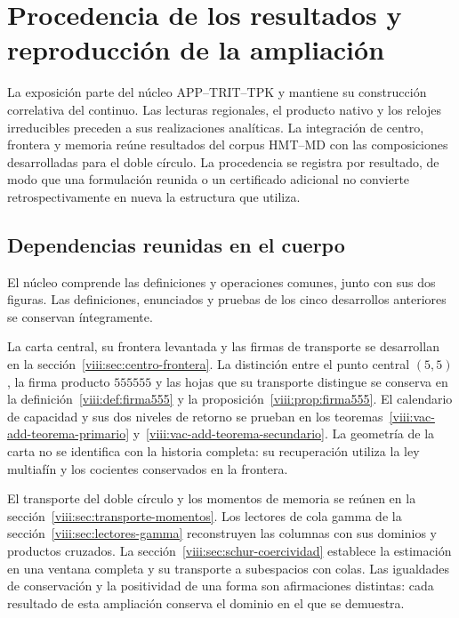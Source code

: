 \section{Procedencia de los resultados y reproducción de la ampliación}
\label{viii:ap:procedencia-reproduccion}
\begingroup
\setlength{\parskip}{1pt}

La exposición parte del núcleo APP--TRIT--TPK y mantiene su construcción
correlativa del continuo. Las lecturas regionales, el producto nativo y los
relojes irreducibles preceden a sus realizaciones analíticas. La integración
de centro, frontera y memoria reúne resultados del corpus HMT--MD con
las composiciones desarrolladas para el doble círculo. La procedencia se
registra por resultado, de modo que una formulación reunida o un certificado
adicional no convierte retrospectivamente en nueva la estructura que utiliza.

\subsection{Dependencias reunidas en el cuerpo}

El núcleo comprende las definiciones y operaciones comunes, junto con
sus dos figuras. Las definiciones, enunciados y pruebas de los cinco
desarrollos anteriores se conservan íntegramente.

La carta central, su frontera levantada y las firmas de transporte se
desarrollan en la sección~\ref{viii:sec:centro-frontera}. La distinción entre
el punto central \((5,5)\), la firma producto \(555555\) y las hojas que
su transporte distingue se conserva en la definición~\ref{viii:def:firma555}
y la proposición~\ref{viii:prop:firma555}. El calendario de capacidad y sus
dos niveles de retorno se prueban en los
teoremas~\ref{viii:vac-add-teorema-primario} y~\ref{viii:vac-add-teorema-secundario}.
La geometría de la carta no se identifica con la historia completa: su
recuperación utiliza la ley multiafín y los cocientes conservados en la frontera.

El transporte del doble círculo y los momentos de memoria se reúnen en
la sección~\ref{viii:sec:transporte-momentos}. Los lectores de cola gamma de
la sección~\ref{viii:sec:lectores-gamma} reconstruyen las columnas con sus
dominios y productos cruzados. La sección~\ref{viii:sec:schur-coercividad}
establece la estimación en una ventana completa y su transporte a
subespacios con colas. Las igualdades de conservación y la positividad
de una forma son afirmaciones distintas: cada resultado de esta ampliación
conserva el dominio en el que se demuestra.

